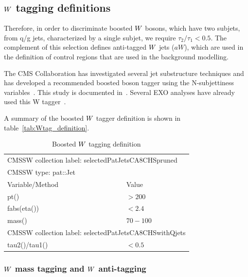 \subsection{\texorpdfstring{$W$}{W} tagging definitions}

Therefore, in order to discriminate boosted $W$ bosons, which have two subjets, from q/g jets,
characterized by a single subjet, we require $\tau_2 / \tau_1 < 0.5$.  The complement of this
selection defines anti-tagged $W$ jets ($aW$), which are used in the definition of control regions
that are used in the background modelling.

\cite{EXO-12-024,CMS-PAS-JME-13-006}

The CMS Collaboration has investigated several jet substructure techniques and has developed a
recommended boosted boson tagger using the N-subjettiness variables~\cite{Thaler:2010tr}. This
study
is documented in~\cite{CMS-PAS-JME-13-006}.  
Several EXO analyses have already used this W tagger~\cite{EXO-12-024,EXO-13-009}.

A summary of the boosted $W$ tagger definition is shown in table~\ref{tab:Wtag_definition}. 

\begin{table}[htdp]
\caption{Boosted $W$ tagging definition}
\centering
\begin{tabular}{|ll|}
\hline
\multicolumn{2}{|l|}{CMSSW collection label: selectedPatJetsCA8CHSpruned} \\
\multicolumn{2}{|l|}{CMSSW type: pat::Jet} \\
\hline
Variable/Method & Value \\
\hline
pt() & $> 200$ \\
fabs(eta()) & $< 2.4$ \\
mass() & $70-100$ \\
\hline
\multicolumn{2}{|l|}{CMSSW collection label: selectedPatJetsCA8CHSwithQjets} \\
\hline
tau2()/tau1() & $< 0.5$ \\
\hline
\end{tabular}
\label{tab:Wtag_EXO}
\end{table}





\subsubsection{\texorpdfstring{$W$}{W} mass tagging and \texorpdfstring{$W$}{W} anti-tagging
\label{sec:W_mass_anti_tagging}}

